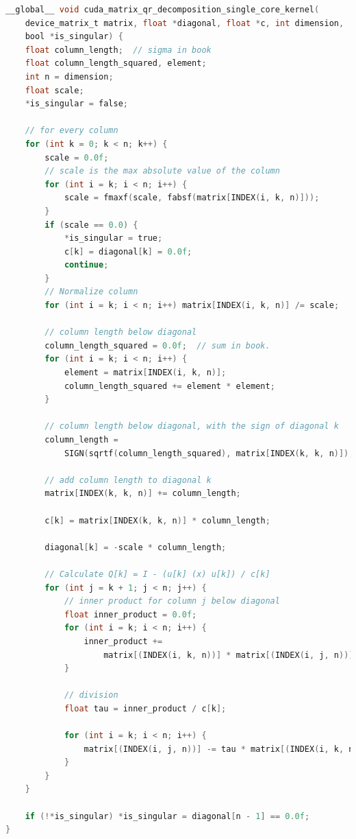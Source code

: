 \begin{lstlisting}[language=C, caption={QR Decomposition GPU Single Core implementation}, label={lst:qr_gpu_singlecore}]
__global__ void cuda_matrix_qr_decomposition_single_core_kernel(
    device_matrix_t matrix, float *diagonal, float *c, int dimension,
    bool *is_singular) {
    float column_length;  // sigma in book
    float column_length_squared, element;
    int n = dimension;
    float scale;
    *is_singular = false;

    // for every column
    for (int k = 0; k < n; k++) {
        scale = 0.0f;
        // scale is the max absolute value of the column
        for (int i = k; i < n; i++) {
            scale = fmaxf(scale, fabsf(matrix[INDEX(i, k, n)]));
        }
        if (scale == 0.0) {
            *is_singular = true;
            c[k] = diagonal[k] = 0.0f;
            continue;
        }
        // Normalize column
        for (int i = k; i < n; i++) matrix[INDEX(i, k, n)] /= scale;

        // column length below diagonal
        column_length_squared = 0.0f;  // sum in book.
        for (int i = k; i < n; i++) {
            element = matrix[INDEX(i, k, n)];
            column_length_squared += element * element;
        }

        // column length below diagonal, with the sign of diagonal k
        column_length =
            SIGN(sqrtf(column_length_squared), matrix[INDEX(k, k, n)]);

        // add column length to diagonal k
        matrix[INDEX(k, k, n)] += column_length;

        c[k] = matrix[INDEX(k, k, n)] * column_length;

        diagonal[k] = -scale * column_length;

        // Calculate Q[k] = I - (u[k] (x) u[k]) / c[k]
        for (int j = k + 1; j < n; j++) {
            // inner product for column j below diagonal
            float inner_product = 0.0f;
            for (int i = k; i < n; i++) {
                inner_product +=
                    matrix[(INDEX(i, k, n))] * matrix[(INDEX(i, j, n))];
            }

            // division
            float tau = inner_product / c[k];

            for (int i = k; i < n; i++) {
                matrix[(INDEX(i, j, n))] -= tau * matrix[(INDEX(i, k, n))];
            }
        }
    }

    if (!*is_singular) *is_singular = diagonal[n - 1] == 0.0f;
}
\end{lstlisting}

